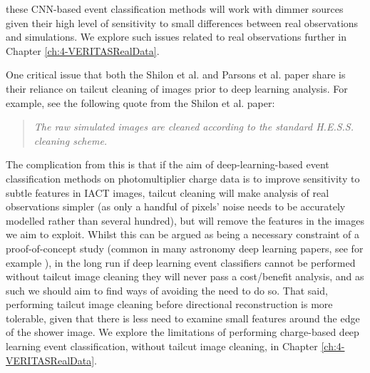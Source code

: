 these CNN-based event classification methods will work with dimmer sources given their high level of sensitivity to small differences between real observations and simulations. We explore such issues related to real observations further in Chapter \ref{ch:4-VERITASRealData}.

One critical issue that both the Shilon et al. and Parsons et al. paper share is their reliance on tailcut cleaning of images prior to deep learning analysis. For example, see the following quote from the Shilon et al. paper:
\begin{quote}
    \textit{The raw simulated images are cleaned according to the standard H.E.S.S. cleaning scheme.}
\end{quote}

The complication from this is that if the aim of deep-learning-based event classification methods on photomultiplier charge data is to improve sensitivity to subtle features in IACT images, tailcut cleaning will make analysis of real observations simpler (as only a handful of pixels' noise needs to be accurately modelled rather than several hundred), but will remove the features in the images we aim to exploit. Whilst this can be argued as being a necessary constraint of a proof-of-concept study (common in many astronomy deep learning papers, see for example \cite{dodgygal}), in the long run if deep learning event classifiers cannot be performed without tailcut image cleaning they will never pass a cost/benefit analysis, and as such we should aim to find ways of avoiding the need to do so. That said, performing tailcut image cleaning before directional reconstruction is more tolerable, given that there is less need to examine small features around the edge of the shower image. We explore the limitations of performing charge-based deep learning event classification, without tailcut image cleaning, in Chapter \ref{ch:4-VERITASRealData}.  

